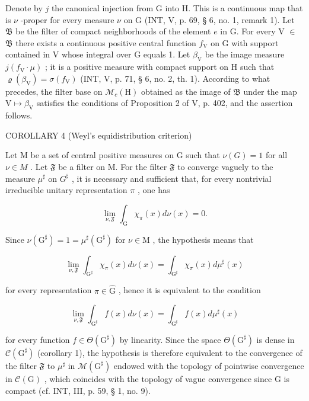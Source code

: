 Denote by \(j\) the canonical injection from G into H. This is a continuous map that is \(\nu\) -proper for every measure \(\nu\) on G (INT, V, p. 69, § 6, no. 1, remark 1). Let \(\mathfrak{B}\) be the filter of compact neighborhoods of the element \(e\) in G. For every V \(\in\) \(\mathfrak{B}\) there exists a continuous positive central function \(f_{\mathrm{V}}\) on G with support contained in V whose integral over G equals 1. Let \(\beta_{\mathrm{V}}\) be the image measure \(j(f_{\mathrm{V}} \cdot \mu)\) ; it is a positive measure with compact support on H such that \(\varrho(\beta_{\mathrm{V}}) = \sigma(f_{\mathrm{V}})\) (INT, V, p. 71, § 6, no. 2, th. 1). According to what precedes, the filter base on \(\mathcal{M}_{c}(\mathrm{H})\) obtained as the image of \(\mathfrak{B}\) under the map \(\mathrm{V} \mapsto \beta_{\mathrm{V}}\) satisfies the conditions of Proposition 2 of V, p. 402, and the assertion follows.

COROLLARY 4 (Weyl's equidistribution criterion)

Let M be a set of central positive measures on G such that \(\nu(G)=1\) for all \(\nu\in M\) . Let \(\mathfrak{F}\) be a filter on M. For the filter \(\mathfrak{F}\) to converge vaguely to the measure \(\mu^{\sharp}\) on \(G^{\sharp}\) , it is necessary and sufficient that, for every nontrivial irreducible unitary representation \(\pi\) , one has

\[
\lim _ {\nu , \mathfrak {F}} \int_ {\mathrm{G}} \chi_ {\pi} (x) d \nu (x) = 0.
\]

Since \(\nu (\mathrm{G}^{\sharp}) = 1 = \mu^{\sharp}(\mathrm{G}^{\sharp})\) for \(\nu \in \mathrm{M}\) , the hypothesis means that

\[
\lim _ {\nu , \mathfrak {F}} \int_ {\mathrm{G} ^ {\sharp}} \chi_ {\pi} (x) d \nu (x) = \int_ {\mathrm{G} ^ {\sharp}} \chi_ {\pi} (x) d \mu^ {\sharp} (x)
\]

for every representation \(\pi\in\widehat{\mathrm{G}}\) , hence it is equivalent to the condition

\[
\lim _ {\nu , \mathfrak {F}} \int_ {\mathrm{G} ^ {\sharp}} f (x) d \nu (x) = \int_ {\mathrm{G} ^ {\sharp}} f (x) d \mu^ {\sharp} (x)
\]

for every function \(f \in \Theta(\mathrm{G}^{\sharp})\) by linearity. Since the space \(\Theta(\mathrm{G}^{\sharp})\) is dense in \(\mathcal{C}(\mathrm{G}^{\sharp})\) (corollary 1), the hypothesis is therefore equivalent to the convergence of the filter \(\mathfrak{F}\) to \(\mu^{\sharp}\) in \(\mathcal{M}(\mathrm{G}^{\sharp})\) endowed with the topology of pointwise convergence in \(\mathcal{C}(\mathrm{G})\) , which coincides with the topology of vague convergence since G is compact (cf. INT, III, p. 59, § 1, no. 9).

